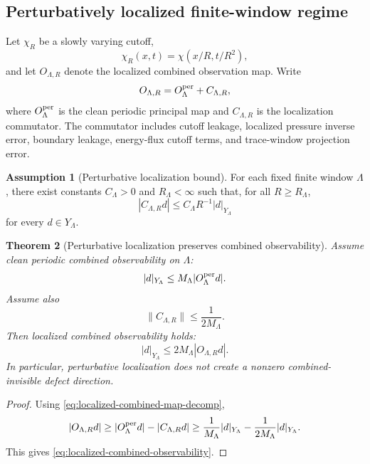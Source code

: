 \documentclass[11pt]{article}
\numberwithin{equation}{section}
\theoremstyle{plain}
\newtheorem{theorem}{Theorem}[section]
\theoremstyle{definition}
\newtheorem{assumption}[theorem]{Assumption}
\theoremstyle{remark}
\begin{document}
\subsection{Perturbatively localized finite-window regime}

Let \(\chi_R\) be a slowly varying cutoff,
\[
        \chi_R(x,t)=\chi(x/R,t/R^2),
\]
and let \(O_{\Lambda,R}\) denote the localized combined observation map.  Write
\begin{equation}
        O_{\Lambda,R}=O_\Lambda^{\rm per}+C_{\Lambda,R},
        \label{eq:localized-combined-map-decomp}
\end{equation}
where \(O_\Lambda^{\rm per}\) is the clean periodic principal map and
\(C_{\Lambda,R}\) is the localization commutator.  The commutator includes
cutoff leakage, localized pressure inverse error, boundary leakage,
energy-flux cutoff terms, and trace-window projection error.

\begin{assumption}[Perturbative localization bound]
\label{ass:perturbative-localization-bound}
For each fixed finite window \(\Lambda\), there exist constants \(C_\Lambda>0\)
and \(R_\Lambda<\infty\) such that, for all \(R\ge R_\Lambda\),
\begin{equation}
        |C_{\Lambda,R}d|
        \le
        C_\Lambda R^{-1}|d|_{Y_\Lambda}
        \label{eq:perturbative-localization-bound}
\end{equation}
for every \(d\in Y_\Lambda\).
\end{assumption}

\begin{theorem}[Perturbative localization preserves combined observability]
\label{thm:perturbative-localization-combined-observability}
Assume clean periodic combined observability on \(\Lambda\):
\[
        |d|_{Y_\Lambda}\le M_\Lambda|O_\Lambda^{\rm per}d|.
\]
Assume also
\[
        \|C_{\Lambda,R}\|\le \frac1{2M_\Lambda}.
\]
Then localized combined observability holds:
\begin{equation}
        |d|_{Y_\Lambda}\le 2M_\Lambda|O_{\Lambda,R}d|.
        \label{eq:localized-combined-observability}
\end{equation}
In particular, perturbative localization does not create a nonzero
combined-invisible defect direction.
\end{theorem}

\begin{proof}
Using \eqref{eq:localized-combined-map-decomp},
\[
        |O_{\Lambda,R}d|
        \ge
        |O_\Lambda^{\rm per}d|-|C_{\Lambda,R}d|
        \ge
        \frac1{M_\Lambda}|d|_{Y_\Lambda}
        -
        \frac1{2M_\Lambda}|d|_{Y_\Lambda}.
\]
This gives \eqref{eq:localized-combined-observability}.
\end{proof}
\end{document}
